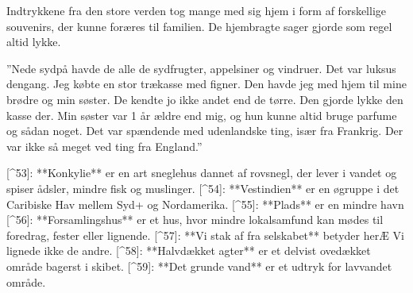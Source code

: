 \documentclass{book}
\begin{document}
Indtrykkene fra den store verden tog mange med sig hjem i form af forskellige souvenirs,
der kunne foræres til familien. De hjembragte sager gjorde som regel altid lykke.

”Nede sydpå havde de alle de sydfrugter, appelsiner og vindruer. Det var luksus dengang.
Jeg købte en stor trækasse med figner. Den havde jeg med hjem til mine brødre og min
søster. De kendte jo ikke andet end de tørre. Den gjorde lykke den kasse der. Min søster
var 1 år ældre end mig, og hun kunne altid bruge parfume og sådan noget. Det var spændende
med udenlandske ting, især fra Frankrig. Der var ikke så meget ved ting fra England.”

[^53]: **Konkylie** er en art sneglehus dannet af rovsnegl, der lever i vandet
  og spiser ådsler, mindre fisk og muslinger.
[^54]: **Vestindien** er en øgruppe i det Caribiske Hav mellem Syd+ og
  Nordamerika.
[^55]: **Plads** er en mindre havn
[^56]: **Forsamlingshus** er et hus, hvor mindre lokalsamfund kan mødes til
  foredrag, fester eller lignende.
[^57]: **Vi stak af fra selskabet** betyder herÆ Vi lignede ikke de andre.
[^58]: **Halvdækket agter** er et delvist ovedækket område bagerst i
  skibet.
[^59]: **Det grunde vand** er et udtryk for lavvandet område.
\end{document}
